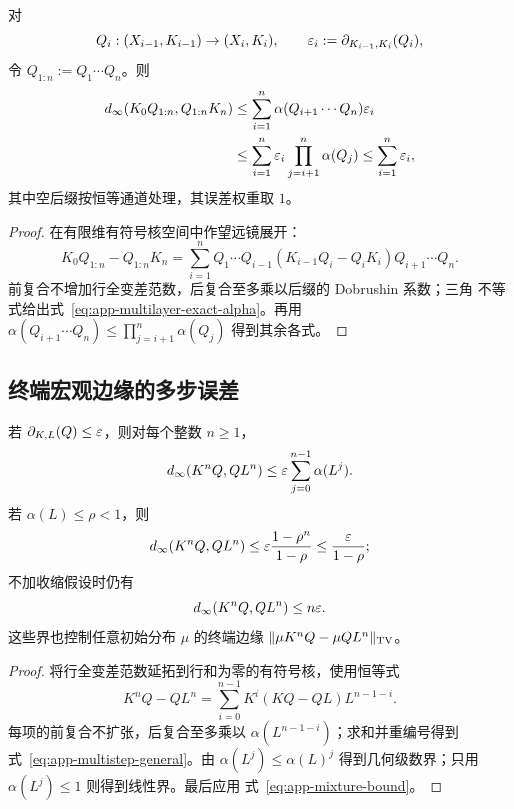 \begin{corollary}[多层空间误差]
\label{cor:app-multilayer-composition}
对
\[
 Q_i:(X_{i-1},K_{i-1})\to(X_i,K_i),
 \qquad
 \varepsilon_i:=\partial_{K_{i-1},K_i}(Q_i),
\]
令 $Q_{1:n}:=Q_1\cdots Q_n$。则
\begin{align}
 d_\infty(K_0Q_{1:n},Q_{1:n}K_n)
 &\le\sum_{i=1}^n
 \alpha(Q_{i+1}\cdots Q_n)\varepsilon_i
 \label{eq:app-multilayer-exact-alpha}\\
 &\le\sum_{i=1}^n\varepsilon_i
       \prod_{j=i+1}^n\alpha(Q_j)
 \le\sum_{i=1}^n\varepsilon_i,
 \label{eq:app-multilayer-product-alpha}
\end{align}
其中空后缀按恒等通道处理，其误差权重取 $1$。
\end{corollary}

\begin{proof}
在有限维有符号核空间中作望远镜展开：
\[
 K_0Q_{1:n}-Q_{1:n}K_n
 =\sum_{i=1}^n Q_1\cdots Q_{i-1}
   (K_{i-1}Q_i-Q_iK_i)Q_{i+1}\cdots Q_n.
\]
前复合不增加行全变差范数，后复合至多乘以后缀的 Dobrushin 系数；三角
不等式给出式~\eqref{eq:app-multilayer-exact-alpha}。再用
$\alpha(Q_{i+1}\cdots Q_n)\le\prod_{j=i+1}^n\alpha(Q_j)$ 得到其余各式。
\end{proof}

\subsection{终端宏观边缘的多步误差}

\begin{theorem}
\label{thm:app-multistep-marginal}
若 $\partial_{K,L}(Q)\le\varepsilon$，则对每个整数 $n\ge1$，
\begin{equation}
 d_\infty(K^nQ,QL^n)
 \le \varepsilon\sum_{j=0}^{n-1}\alpha(L^j).
 \label{eq:app-multistep-general}
\end{equation}
若 $\alpha(L)\le\rho<1$，则
\begin{equation}
 d_\infty(K^nQ,QL^n)
 \le\varepsilon\frac{1-\rho^n}{1-\rho}
 \le\frac{\varepsilon}{1-\rho};
 \label{eq:app-multistep-contracting}
\end{equation}
不加收缩假设时仍有
\begin{equation}
 d_\infty(K^nQ,QL^n)\le n\varepsilon.
 \label{eq:app-multistep-linear}
\end{equation}
这些界也控制任意初始分布 $\mu$ 的终端边缘
$\|\mu K^nQ-\mu QL^n\|_{\operatorname{TV}}$。
\end{theorem}

\begin{proof}
将行全变差范数延拓到行和为零的有符号核，使用恒等式
\[
 K^nQ-QL^n
 =\sum_{i=0}^{n-1}K^i(KQ-QL)L^{n-1-i}.
\]
每项的前复合不扩张，后复合至多乘以
$\alpha(L^{n-1-i})$；求和并重编号得到
式~\eqref{eq:app-multistep-general}。由
$\alpha(L^j)\le\alpha(L)^j$ 得到几何级数界；只用
$\alpha(L^j)\le1$ 则得到线性界。最后应用
式~\eqref{eq:app-mixture-bound}。
\end{proof}

